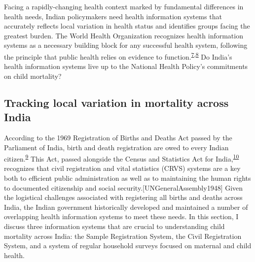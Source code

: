 \documentclass[
]{article}
\begin{document}
Facing a rapidly-changing health context marked by fundamental differences in health needs, Indian policymakers need health information systems that accurately reflects local variation in health status and identifies groups facing the greatest burden. The World Health Organization recognizes health information systems as a necessary building block for any successful health system, following the principle that public health relies on evidence to function.\textsuperscript{\protect\hyperlink{ref-WorldHealthOrganization2010}{7},\protect\hyperlink{ref-Abouzahr2005}{8}} Do India's health information systems live up to the National Health Policy's commitments on child mortality?

\hypertarget{tracking-local-variation-in-mortality-across-india}{%
\subsection{Tracking local variation in mortality across India}\label{tracking-local-variation-in-mortality-across-india}}

According to the 1969 Registration of Births and Deaths Act passed by the Parliament of India, birth and death registration are owed to every Indian citizen.\textsuperscript{\protect\hyperlink{ref-ParliamentoftheRepublicofIndia1969}{9}} This Act, passed alongside the Census and Statistics Act for India,\textsuperscript{\protect\hyperlink{ref-Subramanian1969}{10}} recognizes that civil registration and vital statistics (CRVS) systems are a key both to efficient public administration as well as to maintaining the human rights to documented citizenship and social security.{[}UNGeneralAssembly1948{]} Given the logistical challenges associated with registering all births and deaths across India, the Indian government historically developed and maintained a number of overlapping health information systems to meet these needs. In this section, I discuss three information systems that are crucial to understanding child mortality across India: the Sample Registration System, the Civil Registration System, and a system of regular household surveys focused on maternal and child health.
\end{document}
